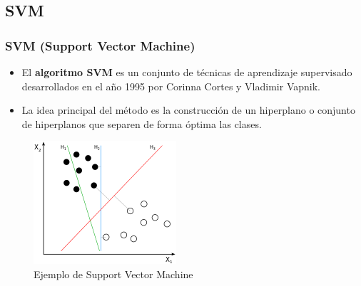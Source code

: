 \documentclass[9pt]{beamer} %
\begin{document}
	\subsection{SVM}
		\begin{frame}
		\frametitle{SVM (Support Vector Machine)}
		\begin{itemize}
				\item El \textbf{algoritmo SVM} es un conjunto de técnicas de aprendizaje supervisado desarrollados en el año 1995 por Corinna Cortes y Vladimir Vapnik.
			\item La idea principal del método es la construcción de un hiperplano o conjunto de hiperplanos que separen de forma óptima las clases.
		\end{itemize}
						\begin{figure}[H]
		\includegraphics[scale=0.6]{SVM} 
		\caption{Ejemplo de Support Vector Machine}
	\end{figure}
		\end{frame}
\end{document}
